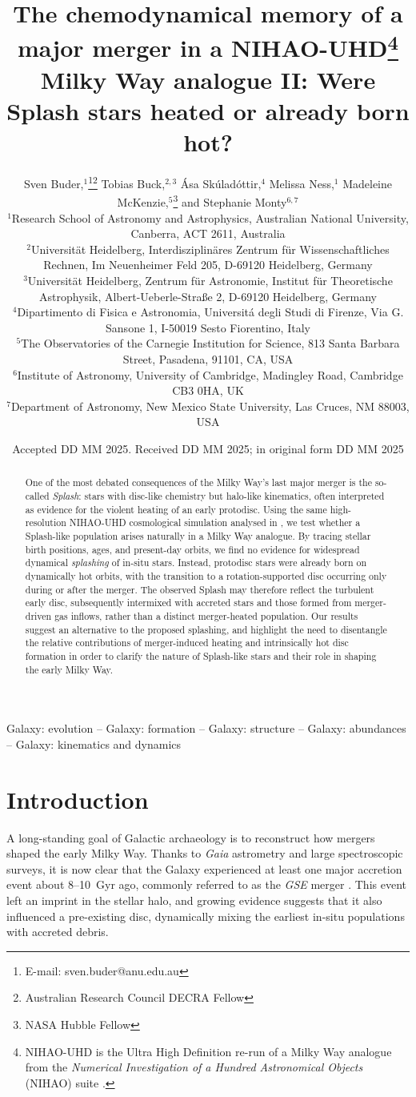 \documentclass[fleqn,usenatbib]{mnras}
\title[Were Splash stars heated or already born hot?]{The chemodynamical memory of a major merger in a NIHAO-UHD\thanks{NIHAO-UHD is the Ultra High Definition re-run of a Milky Way analogue from the \textit{Numerical Investigation of a Hundred Astronomical Objects} (NIHAO) suite \citep{Wang2015}.} Milky Way analogue II: Were Splash stars heated or already born hot?}
\author[S. Buder et al.]{Sven Buder,$^{1}$\thanks{E-mail: sven.buder@anu.edu.au}\thanks{Australian Research Council DECRA Fellow}\orcidlink{0000-0002-4031-8553}
Tobias Buck,$^{2,3}$\orcidlink{0000-0003-2027-399X}
Ása Skúladóttir,$^{4}$\orcidlink{0000-0001-9155-9018}
Melissa Ness,$^{1}$\orcidlink{0000-0001-5082-6693}
Madeleine McKenzie,$^{5}$\thanks{NASA Hubble Fellow}\orcidlink{0000-0002-1715-1257}
and\newauthor
Stephanie Monty$^{6, 7}$\orcidlink{0000-0002-9225-5822}
\\
$^{1}$Research School of Astronomy and Astrophysics, Australian National University, Canberra, ACT 2611, Australia\\
$^{2}$Universit{\"a}t Heidelberg, Interdisziplin{\"a}res Zentrum f{\"u}r Wissenschaftliches Rechnen, Im Neuenheimer Feld 205, D-69120 Heidelberg, Germany\\
$^{3}$Universit{\"a}t Heidelberg, Zentrum f{\"u}r Astronomie, Institut f{\"u}r Theoretische Astrophysik, Albert-Ueberle-Straße 2, D-69120 Heidelberg, Germany\\
$^{4}$Dipartimento di Fisica e Astronomia, Universitá degli Studi di Firenze, Via G. Sansone 1, I-50019 Sesto Fiorentino, Italy\\
$^{5}$The Observatories of the Carnegie Institution for Science, 813 Santa Barbara Street, Pasadena, 91101, CA, USA\\
$^{6}$Institute of Astronomy, University of Cambridge, Madingley Road, Cambridge CB3 0HA, UK\\
$^{7}$Department of Astronomy, New Mexico State University, Las Cruces, NM 88003, USA
}
\date{Accepted DD MM 2025. Received DD MM 2025; in original form DD MM 2025}
\begin{document}
\label{firstpage}
\pagerange{\pageref{firstpage}--\pageref{lastpage}}
\maketitle

\begin{abstract} %
One of the most debated consequences of the Milky Way’s last major merger is the so-called \textit{Splash}: stars with disc-like chemistry but halo-like kinematics, often interpreted as evidence for the violent heating of an early protodisc. Using the same high-resolution NIHAO-UHD cosmological simulation analysed in , we test whether a Splash-like population arises naturally in a Milky Way analogue. By tracing stellar birth positions, ages, and present-day orbits, we find no evidence for widespread dynamical \textit{splashing} of in-situ stars. Instead, protodisc stars were already born on dynamically hot orbits, with the transition to a rotation-supported disc occurring only during or after the merger. The observed Splash may therefore reflect the turbulent early disc, subsequently intermixed with accreted stars and those formed from merger-driven gas inflows, rather than a distinct merger-heated population. Our results suggest an alternative to the proposed splashing, and highlight the need to disentangle the relative contributions of merger-induced heating and intrinsically hot disc formation in order to clarify the nature of Splash-like stars and their role in shaping the early Milky Way.
\end{abstract}

\begin{keywords}
Galaxy: evolution -- Galaxy: formation -- Galaxy: structure -- Galaxy: abundances -- Galaxy: kinematics and dynamics
\end{keywords}


\section{Introduction}
\label{sec:introduction}

A long-standing goal of Galactic archaeology is to reconstruct how mergers shaped the early Milky Way. Thanks to \textit{Gaia} astrometry \citep{Brown2021b} and large spectroscopic surveys, it is now clear that the Galaxy experienced at least one major accretion event about 8--10~Gyr ago, commonly referred to as the \textit{GSE} merger \citep{Belokurov2018, Helmi2018, Naidu2020}. This event left an imprint in the stellar halo, and growing evidence suggests that it also influenced a pre-existing disc, dynamically mixing the earliest in-situ populations with accreted debris.
\end{document}
